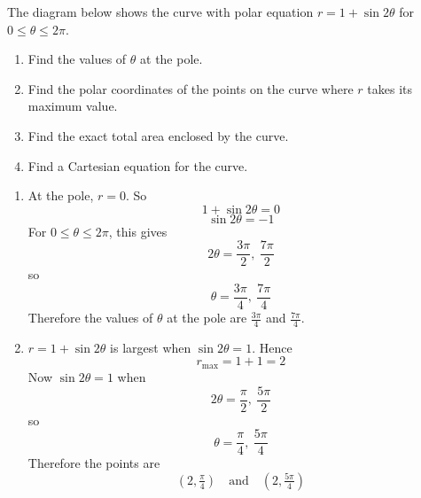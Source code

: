 \documentclass[leqno]{article}
\begin{document}
\begin{enumerate}[
	  label=\textbf{\arabic*.},
	  leftmargin=*,
	  topsep=0pt,
	  partopsep=0pt,
	  parsep=0pt
	]
	
	The diagram below shows the curve with polar equation $r=1+\sin 2\theta$ for $0\leq\theta\leq2\pi$. \\
	\begin{enumerate}[label=\textbf{(\alph*)}]
	  \item Find the values of $\theta$ at the pole.  \\
	  \item Find the polar coordinates of the points on the curve where $r$ takes its maximum value.  \\
	  \item Find the exact total area enclosed by the curve.  \\
	  \item Find a Cartesian equation for the curve.  \\
	\end{enumerate}
	
	\vspace*{30pt}
	
	\begin{tcolorbox}[colback=white, colframe=scarlet, title={\textbf{Solution}}, breakable, grow to left by=6mm, grow to right by=10mm]
	\begin{enumerate}[label=\textbf{(\alph*)}]
	  \item At the pole, \(r=0\). So
	  \[
	  1+\sin 2\theta=0
	  \]
	  \[
	  \sin 2\theta=-1
	  \]
	  For \(0\leq \theta \leq 2\pi\), this gives
	  \[
	  2\theta=\frac{3\pi}{2},\ \frac{7\pi}{2}
	  \]
	  so
	  \[
	  \theta=\frac{3\pi}{4},\ \frac{7\pi}{4}
	  \]
	  Therefore the values of \(\theta\) at the pole are \(\displaystyle \frac{3\pi}{4}\) and \(\displaystyle \frac{7\pi}{4}\).
	
	  \item \(r=1+\sin 2\theta\) is largest when \(\sin 2\theta=1\). Hence
	  \[
	  r_{\max}=1+1=2
	  \]
	  Now \(\sin 2\theta=1\) when
	  \[
	  2\theta=\frac{\pi}{2},\ \frac{5\pi}{2}
	  \]
	  so
	  \[
	  \theta=\frac{\pi}{4},\ \frac{5\pi}{4}
	  \]
	  Therefore the points are
	  \[
	  (2,\tfrac{\pi}{4}) \quad \text{and} \quad (2,\tfrac{5\pi}{4})
	  \]
	

\end{enumerate}
\end{tcolorbox}
\end{enumerate}
\end{document}
